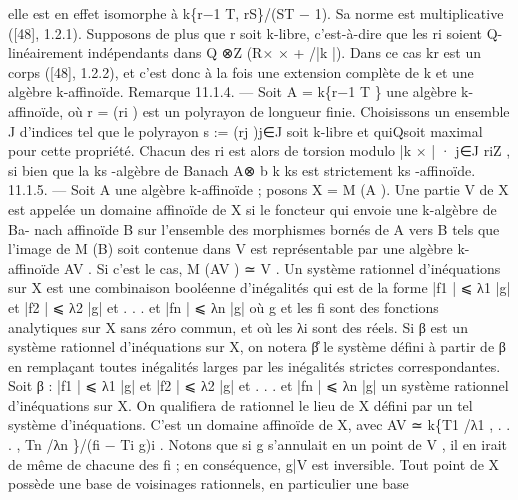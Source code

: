 \documentclass[
  10pt,
]{article}
\newenvironment{Shaded}{}{}
\newcommand{\NormalTok}[1]{#1}
\begin{document}
\begin{Shaded}
\begin{Highlighting}[]
\NormalTok{elle est en effet isomorphe à k\{r−1 T, rS\}/(ST − 1). Sa norme est multiplicative ([48],}
\NormalTok{1.2.1). Supposons de plus que r soit k{-}libre, c’est{-}à{-}dire que les ri soient Q{-}linéairement}
\NormalTok{indépendants dans Q ⊗Z (R×           ×}
\NormalTok{                                + /|k |). Dans ce cas kr est un corps ([48], 1.2.2), et c’est}
\NormalTok{donc à la fois une extension complète de k et une algèbre k{-}affinoïde.}
\NormalTok{Remarque 11.1.4. — Soit A = k\{r−1 T \} une algèbre k{-}affinoïde, où r = (ri ) est un}
\NormalTok{polyrayon de longueur finie. Choisissons un ensemble J d’indices tel que le polyrayon}
\NormalTok{s := (rj )j∈J soit k{-}libre et quiQsoit maximal pour cette propriété. Chacun des ri est}
\NormalTok{alors de torsion modulo |k × | · j∈J riZ , si bien que la ks {-}algèbre de Banach A⊗}
\NormalTok{                                                                                 b k ks est}
\NormalTok{strictement ks {-}affinoïde.}
\NormalTok{11.1.5. — Soit A une algèbre k{-}affinoïde ; posons X = M (A ). Une partie V de X}
\NormalTok{est appelée un domaine affinoïde de X si le foncteur qui envoie une k{-}algèbre de Ba{-}}
\NormalTok{nach affinoïde B sur l’ensemble des morphismes bornés de A vers B tels que l’image}
\NormalTok{de M (B) soit contenue dans V est représentable par une algèbre k{-}affinoïde AV . Si c’est}
\NormalTok{le cas, M (AV ) ≃ V .}
\NormalTok{   Un système rationnel d’inéquations sur X est une combinaison booléenne d’inégalités}
\NormalTok{qui est de la forme}
\NormalTok{                     |f1 | ⩽ λ1 |g| et |f2 | ⩽ λ2 |g| et . . . et |fn | ⩽ λn |g|}
\NormalTok{où g et les fi sont des fonctions analytiques sur X sans zéro commun, et où les λi sont}
\NormalTok{des réels.}
\NormalTok{  Si β est un système rationnel d’inéquations sur X, on notera β̊ le système défini à partir}
\NormalTok{de β en remplaçant toutes inégalités larges par les inégalités strictes correspondantes.}
\NormalTok{  Soit}
\NormalTok{                    β : |f1 | ⩽ λ1 |g| et |f2 | ⩽ λ2 |g| et . . . et |fn | ⩽ λn |g|}
\NormalTok{un système rationnel d’inéquations sur X.}
\NormalTok{  On qualifiera de rationnel le lieu de X défini par un tel système d’inéquations. C’est}
\NormalTok{un domaine affinoïde de X, avec}
\NormalTok{                          AV ≃ k\{T1 /λ1 , . . . , Tn /λn \}/(fi − Ti g)i .}
\NormalTok{Notons que si g s’annulait en un point de V , il en irait de même de chacune des fi ; en}
\NormalTok{conséquence, g|V est inversible.}
\NormalTok{  Tout point de X possède une base de voisinages rationnels, en particulier une base}

\end{Highlighting}
\end{Shaded}
\end{document}
